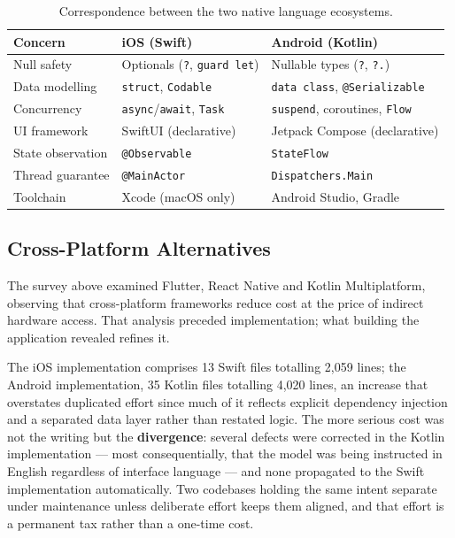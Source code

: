 \begin{table}[H]
\centering
\small
\begin{tabularx}{\textwidth}{@{}lXX@{}}
\toprule
\textbf{Concern} & \textbf{iOS (Swift)} & \textbf{Android (Kotlin)} \\
\midrule
Null safety & Optionals (\texttt{?}, \texttt{guard let}) & Nullable types (\texttt{?}, \texttt{?.}) \\
Data modelling & \texttt{struct}, \texttt{Codable} & \texttt{data class}, \texttt{@Serializable} \\
Concurrency & \texttt{async}/\texttt{await}, \texttt{Task} & \texttt{suspend}, coroutines, \texttt{Flow} \\
UI framework & SwiftUI (declarative) & Jetpack Compose (declarative) \\
State observation & \texttt{@Observable} & \texttt{StateFlow} \\
Thread guarantee & \texttt{@MainActor} & \texttt{Dispatchers.Main} \\
Toolchain & Xcode (macOS only) & Android Studio, Gradle \\
\bottomrule
\end{tabularx}
\caption{Correspondence between the two native language ecosystems.}
\end{table}

\subsection{Cross-Platform Alternatives}

The survey above examined Flutter, React Native and Kotlin Multiplatform, observing that
cross-platform frameworks reduce cost at the price of indirect hardware access. That analysis
preceded implementation; what building the application revealed refines it.

The iOS implementation comprises 13 Swift files totalling 2{,}059 lines; the Android
implementation, 35 Kotlin files totalling 4{,}020 lines, an increase that overstates duplicated
effort since much of it reflects explicit dependency injection and a separated data layer
rather than restated logic. The more serious cost was not the writing but the
\textbf{divergence}: several defects were corrected in the Kotlin implementation --- most
consequentially, that the model was being instructed in English regardless of interface
language --- and none propagated to the Swift implementation automatically. Two codebases
holding the same intent separate under maintenance unless deliberate effort keeps them aligned,
and that effort is a permanent tax rather than a one-time cost.

